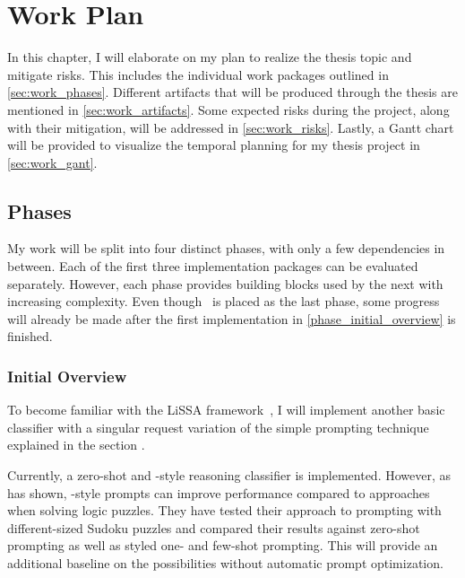 \chapter{Work Plan}
\label{chap:work_plan}

In this chapter, I will elaborate on my plan to realize the thesis topic and mitigate risks.
This includes the individual work packages outlined in \autoref{sec:work_phases}.
Different artifacts that will be produced through the thesis are mentioned in \autoref{sec:work_artifacts}.
Some expected risks during the project, along with their mitigation, will be addressed in \autoref{sec:work_risks}.
Lastly, a Gantt chart will be provided to visualize the temporal planning for my thesis project in \autoref{sec:work_gant}.

\section{Phases}
\label{sec:work_phases}

My work will be split into four distinct phases, with only a few dependencies in between.
Each of the first three implementation packages can be evaluated separately.
However, each phase provides building blocks used by the next with increasing complexity.
Even though~ is placed as the last phase, some progress will already be made after the first implementation in \autoref{phase_initial_overview} is finished.


\subsection{Initial Overview}
\label{phase_initial_overview}

To become familiar with the LiSSA framework~\cite{fuchss2025LiSSAGeneric}, I will implement another basic classifier with a singular request variation of the simple prompting technique \ToT~\cite{long2023LargeLanguage} explained in the section .

Currently, a zero-shot and \CoT-style reasoning classifier is implemented.
However, as \citeauthor{long2023LargeLanguage} has shown, \ToT-style prompts can improve performance compared to \CoT approaches when solving logic puzzles.
They have tested their approach to \ToT prompting with different-sized Sudoku puzzles and compared their results against zero-shot prompting as well as \CoT styled one- and few-shot prompting.
This will provide an additional baseline on the possibilities without automatic prompt optimization.


